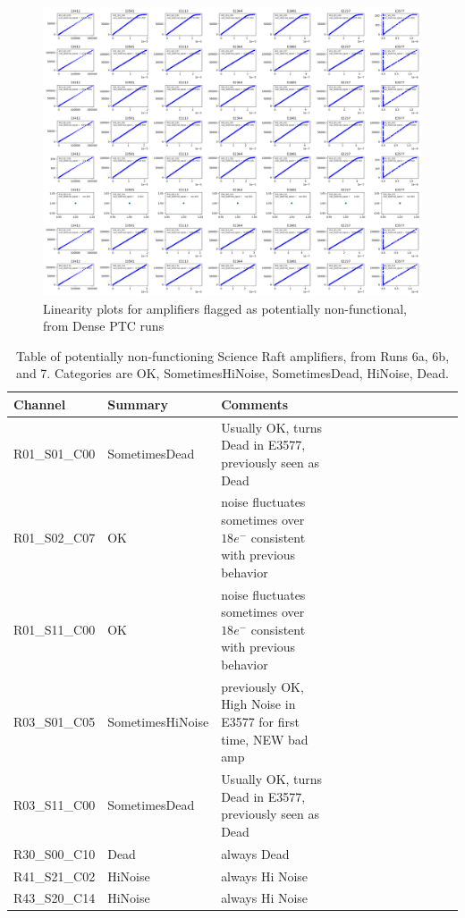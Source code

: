\begin{figure}[ht]
    \centering
    \includegraphics[width=0.95\linewidth]{figures/lin_badamps.png}
    \caption{Linearity plots for amplifiers flagged as potentially non-functional, from Dense PTC runs}
    \label{fig:lin-badamps}
\end{figure}

\begin{table}[!ht]
    \tiny
    \centering
    \begin{tabular}{|l|l|l|l|l|l|l|l|l|l|l|l|l|}
    \hline
        Channel & Summary & Comments  \\ \hline

R01\_S01\_C00  & SometimesDead & Usually OK, turns Dead in E3577, previously seen as Dead \\ \hline
R01\_S02\_C07  & OK & noise fluctuates sometimes over $18e^-$ consistent with previous behavior \\ \hline
R01\_S11\_C00  & OK & noise fluctuates sometimes over $18e^-$ consistent with previous behavior \\ \hline
R03\_S01\_C05  & SometimesHiNoise & previously OK,  High Noise in E3577 for first time, NEW bad amp \\ \hline
R03\_S11\_C00  & SometimesDead & Usually OK, turns Dead in E3577, previously seen as Dead \\ \hline
R30\_S00\_C10  & Dead & always Dead \\ \hline
R41\_S21\_C02  & HiNoise & always Hi Noise \\ \hline
R43\_S20\_C14  & HiNoise & always Hi Noise \\ \hline

    \end{tabular}
    \caption{Table of potentially non-functioning Science Raft amplifiers, from Runs 6a, 6b, and 7. Categories are OK, SometimesHiNoise, SometimesDead, HiNoise, Dead. \label{tab:gds_amps}}
\end{table}

